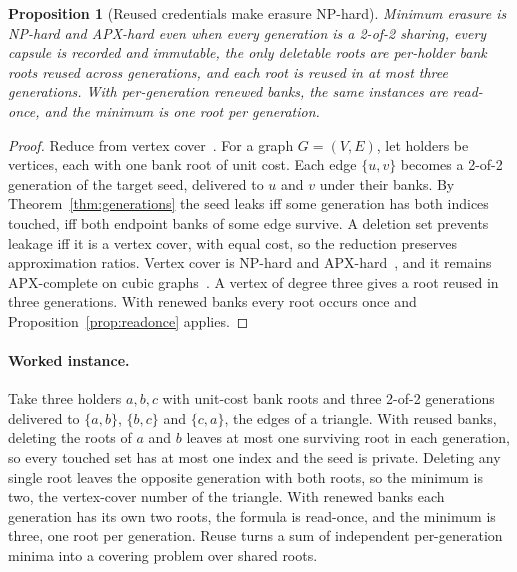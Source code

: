 \documentclass[pdflatex,sn-mathphys-num]{sn-jnl}%
\theoremstyle{plain}
\newtheorem{proposition}[theorem]{Proposition}
\theoremstyle{definition}
\begin{document}
\begin{proposition}[Reused credentials make erasure NP-hard]\label{prop:hard}
Minimum erasure is NP-hard and APX-hard even when every generation is a 2-of-2 sharing, every capsule is recorded and immutable, the only deletable roots are per-holder bank roots reused across generations, and each root is reused in at most three generations. With per-generation renewed banks, the same instances are read-once, and the minimum is one root per generation.
\end{proposition}
\begin{proof}
Reduce from vertex cover~\cite{karp1972}. For a graph $G=(V,E)$, let holders be vertices, each with one bank root of unit cost. Each edge $\{u,v\}$ becomes a 2-of-2 generation of the target seed, delivered to $u$ and $v$ under their banks. By Theorem~\ref{thm:generations} the seed leaks iff some generation has both indices touched, iff both endpoint banks of some edge survive. A deletion set prevents leakage iff it is a vertex cover, with equal cost, so the reduction preserves approximation ratios. Vertex cover is NP-hard and APX-hard~\cite{karp1972,dinur2005}, and it remains APX-complete on cubic graphs~\cite{alimonti2000}. A vertex of degree three gives a root reused in three generations. With renewed banks every root occurs once and Proposition~\ref{prop:readonce} applies.
\end{proof}

\paragraph{Worked instance.}
Take three holders $a,b,c$ with unit-cost bank roots and three 2-of-2 generations delivered to $\{a,b\}$, $\{b,c\}$ and $\{c,a\}$, the edges of a triangle. With reused banks, deleting the roots of $a$ and $b$ leaves at most one surviving root in each generation, so every touched set has at most one index and the seed is private. Deleting any single root leaves the opposite generation with both roots, so the minimum is two, the vertex-cover number of the triangle. With renewed banks each generation has its own two roots, the formula is read-once, and the minimum is three, one root per generation. Reuse turns a sum of independent per-generation minima into a covering problem over shared roots.
\end{document}
